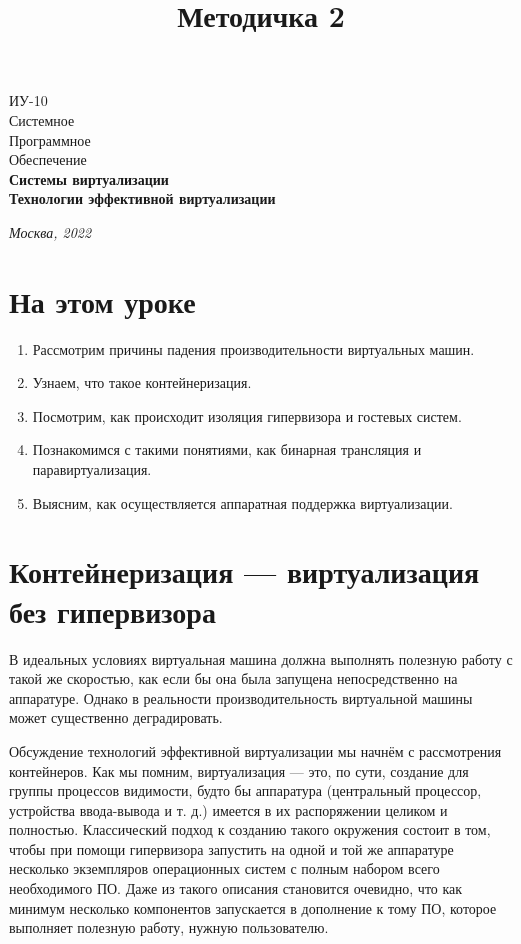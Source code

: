 \documentclass[14pt, a4paper]{article}
\title{Методичка 2}
\begin{document}
\begin{titlepage}
    \topmargin=216pt
    \newpage
    \hangindent=0.7cm
    \huge ИУ-10\\
    Системное\\
    Программное\\
    Обеспечение\\
    \textbf{Системы виртуализации\\ Технологии эффективной виртуализации}

    \vspace{10cm}

    \begin{center}
        \small\textit{Москва, 2022}
    \end{center}
\end{titlepage}
\section*{На этом уроке}
\begin{enumerate}
    \item Рассмотрим причины падения производительности виртуальных машин.
    \item Узнаем, что такое контейнеризация.
    \item Посмотрим, как происходит изоляция гипервизора и гостевых систем.
    \item Познакомимся с такими понятиями, как бинарная трансляция и паравиртуализация.
    \item Выясним, как осуществляется аппаратная поддержка виртуализации.
\end{enumerate}
\tableofcontents
\newpage



\section*{Контейнеризация — виртуализация без гипервизора}


В идеальных условиях виртуальная машина должна выполнять полезную работу с такой же
скоростью, как если бы она была запущена непосредственно на аппаратуре. Однако в реальности
производительность виртуальной машины может существенно деградировать.

Обсуждение технологий эффективной виртуализации мы начнём с рассмотрения контейнеров. Как мы
помним, виртуализация — это, по сути, создание для группы процессов видимости, будто бы
аппаратура (центральный процессор, устройства ввода-вывода и т. д.) имеется в их распоряжении
целиком и полностью. Классический подход к созданию такого окружения состоит в том, чтобы при
помощи гипервизора запустить на одной и той же аппаратуре несколько экземпляров операционных
систем с полным набором всего необходимого ПО. Даже из такого описания становится очевидно, что
как минимум несколько компонентов запускается в дополнение к тому ПО, которое выполняет
полезную работу, нужную пользователю.
\end{document}
